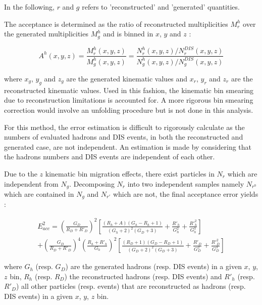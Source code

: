 In the following, $r$ and $g$ refers to 'reconstructed' and 'generated' quantities.

The acceptance is determined as the ratio of reconstructed multiplicities $M^h_r$ over the generated multiplicities $M^h_g$
and is binned in $x$, $y$ and $z$ :

\begin{equation}
  A^h(x,y,z) = \frac{M^h_r(x,y,z)}{M^h_g(x,y,z)}=\frac{N^h_r(x,y,z)/N^{DIS}_r(x,y,z)}{N^h_g(x,y,z)/N^{DIS}_g(x,y,z)}
\end{equation}

where $x_g$, $y_g$ and $z_g$ are the generated kinematic values and $x_r$, $y_r$ and $z_r$ are the reconstructed kinematic
values. Used in this fashion, the kinematic bin smearing due to reconstruction limitations is accounted for. A more rigorous
bin smearing correction would involve an unfolding procedure but is not done in this analysis.

For this method, the error estimation is difficult to rigorously calculate as the numbers of evaluated hadrons and DIS events,
in both the reconstructed and generated case, are not independent. An estimation is made by considering that the hadrons numbers
and DIS events are independent of each other.

Due to the $z$ kinematic bin migration effects, there exist particles in $N_r$ which are independent from $N_g$. Decomposing $N_r$
into two independent samples namely $N_{r^0}$ which are contained in $N_g$ and $N_{r'}$ which are not, the final acceptance error yields :

\begin{equation}
  \begin{split}
    E^2_{acc} = \left (\frac{G_D}{R_D+R'_{D}}\right )^2\left [\frac{(R_h+A)(G_h-R_h+1)}{(G_h+2)^2(G_D+3)}+\frac{R'_{h}}{G^2_h}+\frac{R'^2_h}{G^3_h}\right ] \\
                + \left (\frac{G_D}{R_D+R'_{D}}\right )^4\left (\frac{R_h+R'_h}{G_h}\right )^2\left [\frac{(R_D+1)(G_D-R_D+1)}{(G_D+2)^2(G_D+3)}+\frac{R'_D}{G^2_D}+\frac{R'^2_D}{G^3_D}\right ]
  \end{split}
\end{equation}

where $G_h$ (resp. $G_D$) are the generated hadrons (resp. DIS events) in a given $x$, $y$, $z$ bin, $R_h$ (resp. $R_D$) the reconstructed
hadrons (resp. DIS events) and $R'_h$ (resp. $R'_D$) all other particles (resp. events) that are reconstructed as hadrons (resp. DIS events)
in a given $x$, $y$, $z$ bin.

